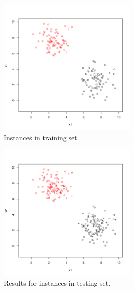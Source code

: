 \documentclass{article}\usepackage[]{graphicx}\usepackage[]{color}
\begin{document}
\begin{figure}
  \centering
  \includegraphics[width=0.6\textwidth]{ex1}
  \caption{Instances in training set.}\label{fig:train}
\end{figure}

\begin{figure}
  \centering
  \includegraphics[width=0.6\textwidth]{ex2}
  \caption{Results for instances in testing set.}\label{fig:test}
\end{figure}
\end{document}
